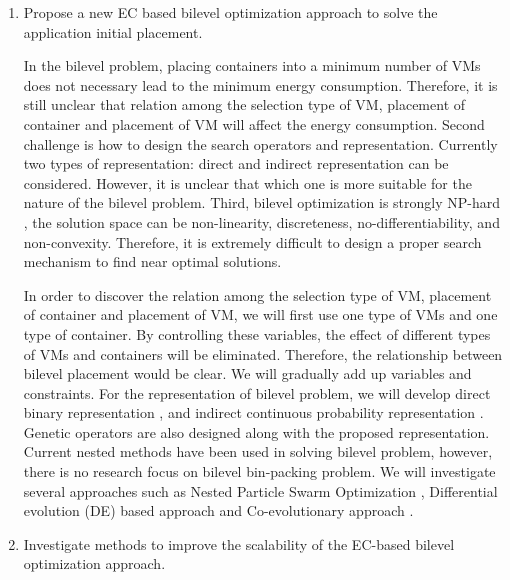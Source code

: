 \begin{enumerate}
	\item Propose a new EC based bilevel optimization approach to solve the application initial placement.\\

	 In the bilevel problem, placing containers into a minimum number of VMs does not necessary lead to the minimum energy consumption. Therefore, it is still unclear that relation among the selection type of VM, placement of container and placement of VM will affect the energy consumption. Second challenge is how to design the search operators and representation. Currently two types of representation: direct and indirect representation can be considered. However, it is unclear that which one is more suitable for the nature of the bilevel problem. Third, bilevel optimization is strongly NP-hard \cite{Mathieu:2011dw}, the solution space can be non-linearity, discreteness, no-differentiability, and non-convexity. Therefore, it is extremely difficult to design a proper search mechanism to find near optimal solutions.

	In order to discover the relation among the selection type of VM, placement of container and placement of VM, we will first use one type of VMs and one type of container. By controlling these variables, the effect of different types of VMs and containers will be eliminated. Therefore, the relationship between bilevel placement would be clear. We will gradually add up variables and constraints. For the representation of bilevel problem, we will develop direct binary representation \cite{Xu:2010vh}, and indirect continuous probability representation \cite{Xiong:2014jq}. Genetic operators are also designed along with the proposed representation.
	Current nested methods have been used in solving bilevel problem, however, there is no research focus on bilevel bin-packing problem. We will investigate several approaches such as Nested Particle Swarm Optimization \cite{Li:2006br}, Differential evolution (DE) based approach \cite{Angelo:2013ee, Zhu:2006in} and Co-evolutionary approach \cite{Legillon:2012dd}.

	\item Investigate methods to improve the scalability of the EC-based bilevel optimization approach.


\end{enumerate}
